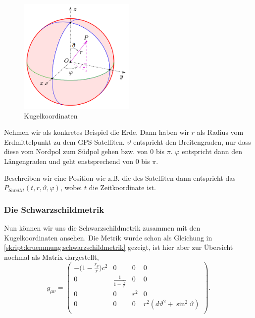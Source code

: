 \begin{refsection}
\begin{figure}[h]
    \centering
    \includegraphics[width=0.5\textwidth]{gps/pictures/kugelkoordinaten.png}
    \caption{Kugelkoordinaten}
\end{figure}

\noindent{}Nehmen wir als konkretes Beispiel die Erde. Dann haben wir $r$ als Radius vom Erdmittelpunkt zu dem GPS-Satelliten. $\vartheta$ entspricht den Breitengraden, nur dass diese vom Nordpol zum Südpol gehen bzw. von 0 bis $\pi$. $\varphi$ entspricht dann den Längengraden und geht enstsprechend von 0 bis $\pi$. 

Beschreiben wir eine Position wie z.B. die des Satelliten dann entspricht das $P_{Satellit}(t,r,\vartheta,\varphi)$, wobei $t$ die Zeitkoordinate ist.

\subsubsection{Die Schwarzschildmetrik}
Nun können wir uns die Schwarzschildmetrik zusammen mit den Kugelkoordinaten ansehen. Die Metrik wurde schon als Gleichung in \eqref{skript:kruemmung:schwarzschildmetrik} gezeigt, ist hier aber zur Übersicht nochmal als Matrix dargestellt, \\

\begin{equation}
g_{\mu\nu}= 
\begin{pmatrix}
-\biggl(1-\frac{r_g}r\biggr)c^2 & 0 & 0 & 0 \\
0 & \frac1{\displaystyle 1-\frac{r_g}r} & 0 & 0 \\
0 & 0 &  r^2 & 0 \\
0 & 0 & 0 & r^2 (d\vartheta^2 + \sin^2\vartheta) \\
\end{pmatrix}.
\label{skript:gps:schwarzschildmetrik}
\end{equation} \\


\end{refsection}
